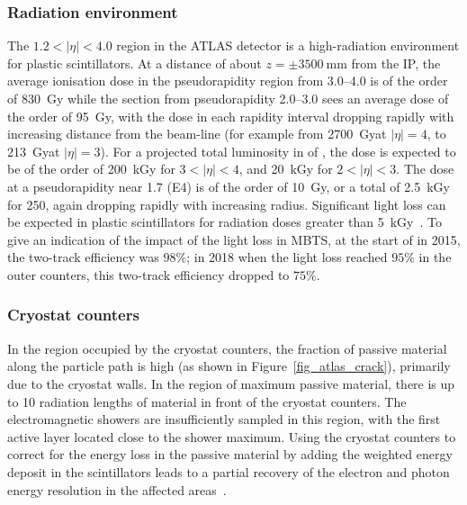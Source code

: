 \documentclass[cernpreprint, atlasdraft=false, UKenglish,british,orcidlogo, texmf, orcidlogo]{atlasdoc}
\begin{document}
 
\subsubsection{Radiation environment}
The $1.2 < |\eta| < 4.0$ region in the ATLAS detector is a high-radiation environment for plastic scintillators. At a distance of about $z=\pm\SI{3500}{\mm}$ from the \gls{IP}, the average ionisation dose in the pseudorapidity region from \numrange[range-phrase=--]{3.0}{4.0} is of the order of \SI{830}{\gray}\perinvfb
while the section from pseudorapidity \numrange[range-phrase=--]{2.0}{3.0} sees an average dose of the order of \SI{95}{\gray}\perinvfb, with the dose in each rapidity interval dropping rapidly with increasing distance from the beam-line (for example from \SI{2700}{\gray}\perinvfb at $|\eta|=4$, to \SI{213}{\gray}\perinvfb at $|\eta|=3$).  For a projected total luminosity in \RunThr of \intlumirunthree, the dose is expected to be of the order of \SI{200}{\kilo\gray} for $3 < |\eta| < 4$,  and \SI{20}{\kilo\gray} for $2 < |\eta| < 3$. 
The dose at a pseudorapidity near 1.7 (E4) is of the order of \SI{10}{\gray}\perinvfb, or a total of \SI{2.5}{\kilo\gray} for \SI{250}{\ifb}, again dropping rapidly with increasing radius. Significant light loss can be expected in plastic scintillators for radiation doses greater than \SI{5}{\kilo\gray}~\cite{Jivan:2015mqk,Liao:2015zsa}. To give an indication of the impact of the light loss in \gls{MBTS}, at the start of \RunTwo in 2015, the two-track efficiency was $98\%$; in 2018 when the light loss reached $95\%$ in the outer counters, this two-track efficiency dropped to $75\%$.
 
\subsubsection{Cryostat counters}
In the region occupied by the cryostat counters, the
fraction of passive material along the particle path is high
(as shown in Figure~\ref{fig_atlas_crack}), primarily due to the cryostat walls. In the region of maximum passive material, there is up to \num{10} radiation lengths of material in front of the cryostat counters.
The electromagnetic showers are insufficiently sampled in this region, with the first active layer located close to the shower maximum.
Using the
cryostat counters
to correct for the energy loss in the passive material by adding the weighted energy deposit in the scintillators
leads to a partial recovery of the electron and photon energy resolution in the affected areas~\cite{ATL-PHYS-PUB-2016-015}.
 
\end{document}
